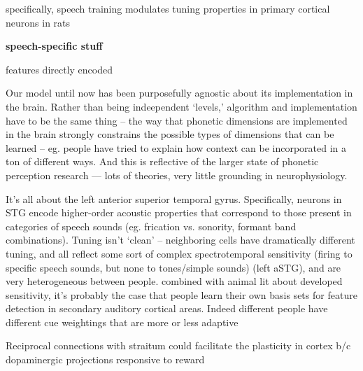 specifically, speech training modulates tuning properties in primary cortical neurons in rats \cite{engineerSpeechTrainingAlters2015a}


\textbf{speech-specific stuff}

features directly encoded\cite{changCategoricalSpeechRepresentation2010b,mesgaraniPhoneticFeatureEncoding2014,belinVoiceselectiveAreasHuman2000b,Pasley2012}



Our model until now has been purposefully agnostic about its implementation in the brain. Rather than being indeependent `levels,' algorithm and implementation have to be the same thing -- the way that phonetic dimensions are implemented in the brain strongly constrains the possible types of dimensions that can be learned -- eg. people have tried to explain how context can be incorporated in a ton of different ways. And this is reflective of the larger state of phonetic perception research --- lots of theories, very little grounding in neurophysiology.

It's all about the left anterior superior temporal gyrus\cite{yiEncodingSpeechSounds2019}. Specifically, neurons in STG encode higher-order acoustic properties that correspond to those present in categories of speech sounds (eg. frication vs. sonority, formant band combinations). Tuning isn't `clean' -- neighboring cells have dramatically different tuning, and all reflect some sort of complex spectrotemporal sensitivity (firing to specific speech sounds, but none to tones/simple sounds) (left aSTG)\cite{chanSpeechSpecificTuningNeurons2014}, and are very heterogeneous between people. combined with animal lit about developed sensitivity, it's probably the case that people learn their own basis sets for feature detection in secondary auditory cortical areas. Indeed different people have different cue weightings that are more or less adaptive\cite{clayardsDifferencesCueWeights2018}



Reciprocal connections with straitum could facilitate the plasticity in cortex b/c dopaminergic projections responsive to reward \cite{fengRoleHumanAuditory2018}

